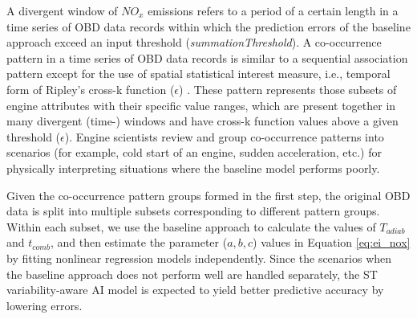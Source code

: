 \documentclass[letterpaper]{article} %
\begin{document}
A divergent window of $NO_x$ emissions refers to a period of a certain length in a time series of OBD data records within which the prediction errors of the baseline approach exceed an input threshold (\textit{summationThreshold}). A co-occurrence pattern in a time series of OBD data records is similar to a sequential association pattern \cite{Srikant1996MiningSP} except for the use of spatial statistical interest measure, i.e., temporal form of Ripley's cross-k function ($\epsilon$)  \cite{AliReem2017Dnwc,ripley1976second}. These pattern represents those subsets of engine attributes with their specific value ranges, which are present together in many divergent (time-) windows and have cross-k function values above a given threshold ($\epsilon$). Engine scientists review and group co-occurrence patterns into scenarios (for example, cold start of an engine, sudden acceleration, etc.) for physically interpreting situations where the baseline model performs poorly. 

Given the co-occurrence pattern groups formed in the first step, the original OBD data is split into multiple subsets corresponding to different pattern groups. Within each subset, we use the baseline approach to calculate the values of $T_{adiab}$ and $t_{comb}$, and then estimate the parameter ($a, b, c$) values in Equation \ref{eq:ei_nox} by fitting nonlinear regression models independently. Since the scenarios when the baseline approach does not perform well are handled separately, the ST variability-aware AI model is expected to yield better predictive accuracy by lowering errors.



    
\end{document}
